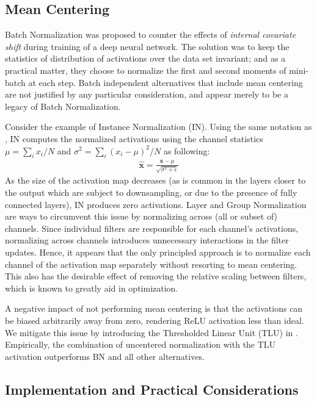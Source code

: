 \documentclass[10pt,twocolumn,letterpaper]{article}
\newcommand{\batchnorm}{BN}
\begin{document}
\subsection{Mean Centering}
\label{sec:mean_centering}

Batch Normalization was proposed to counter the effects of \emph{internal covariate shift} during training of a deep neural network. The solution was to keep the statistics of distribution of activations over the data set invariant; and as a practical matter, they choose to normalize the first and second moments of mini-batch at each step. Batch independent alternatives that include mean centering are not justified by any particular consideration, and appear merely to be a legacy of Batch Normalization.

Consider the example of Instance Normalization (IN). Using the same notation as , IN computes the  normalized activations using the channel statistics $\mu{=}\sum_i x_i/N$ and $\sigma^2{=}\sum_i (x_i{-}\mu)^2/N$ as following:
\begin{align}
\hat{\bm{x}} = \frac{\bm{x} - \mu}{\sqrt{\sigma^2 + \epsilon}}
\label{eq:instancenorm}
\end{align}
As the size of the activation map decreases (as is common in the layers closer to the output which are subject to downsampling, or due to the presence of fully connected layers), IN produces zero activations. Layer and Group Normalization are ways to circumvent this issue by normalizing across (all or subset of) channels. Since individual filters are responsible for each channel's activations, normalizing across channels introduces unnecessary interactions in the filter updates. Hence, it appears that the only principled approach is to normalize each channel of the activation map separately without resorting to mean centering. This also has the desirable effect of removing the relative scaling between filters, which is known to greatly aid in optimization.

A negative impact of not performing mean centering is that the activations can be biased arbitrarily away from zero, rendering ReLU activation less than ideal. We mitigate this issue by introducing the Thresholded Linear Unit (TLU) in . Empirically, the combination of uncentered normalization with the TLU activation outperforms \batchnorm{} and all other alternatives.


\subsection{Implementation and Practical Considerations}
\label{sec:learning_rate}
\end{document}
